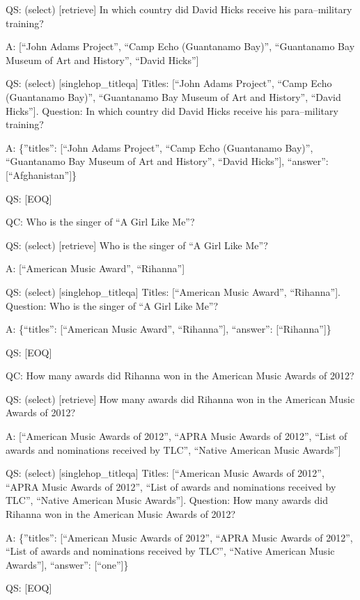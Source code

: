 \documentclass[
]{article}
\begin{document}
QS: (select) {[}retrieve{]} In which country did David Hicks receive his
para--military training?

A: {[}``John Adams Project'', ``Camp Echo (Guantanamo Bay)'',
``Guantanamo Bay Museum of Art and History'', ``David Hicks''{]}

QS: (select) {[}singlehop\_titleqa{]} Titles: {[}``John Adams Project'',
``Camp Echo (Guantanamo Bay)'', ``Guantanamo Bay Museum of Art and
History'', ``David Hicks''{]}. Question: In which country did David
Hicks receive his para--military training?

A: \{''titles'': {[}``John Adams Project'', ``Camp Echo (Guantanamo
Bay)'', ``Guantanamo Bay Museum of Art and History'', ``David
Hicks''{]}, ``answer'': {[}``Afghanistan''{]}\}

QS: {[}EOQ{]}

QC: Who is the singer of ``A Girl Like Me''?

QS: (select) {[}retrieve{]} Who is the singer of ``A Girl Like Me''?

A: {[}``American Music Award'', ``Rihanna''{]}

QS: (select) {[}singlehop\_titleqa{]} Titles: {[}``American Music
Award'', ``Rihanna''{]}. Question: Who is the singer of ``A Girl Like
Me''?

A: \{``titles'': {[}``American Music Award'', ``Rihanna''{]},
``answer'': {[}``Rihanna''{]}\}

QS: {[}EOQ{]}

QC: How many awards did Rihanna won in the American Music Awards of
2012?

QS: (select) {[}retrieve{]} How many awards did Rihanna won in the
American Music Awards of 2012?

A: {[}``American Music Awards of 2012'', ``APRA Music Awards of 2012'',
``List of awards and nominations received by TLC'', ``Native American
Music Awards''{]}

QS: (select) {[}singlehop\_titleqa{]} Titles: {[}``American Music Awards
of 2012'', ``APRA Music Awards of 2012'', ``List of awards and
nominations received by TLC'', ``Native American Music Awards''{]}.
Question: How many awards did Rihanna won in the American Music Awards
of 2012?

A: \{''titles'': {[}``American Music Awards of 2012'', ``APRA Music
Awards of 2012'', ``List of awards and nominations received by TLC'',
``Native American Music Awards''{]}, ``answer'': {[}``one''{]}\}

QS: {[}EOQ{]}
\end{document}
